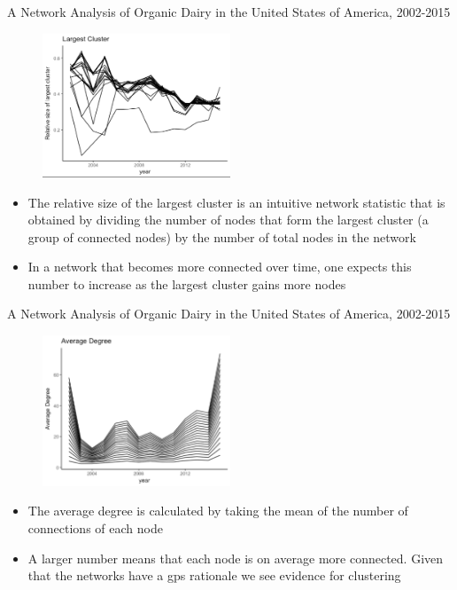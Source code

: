 \documentclass[20]{beamer}
\begin{document}
\begin{frame}{A Network Analysis of Organic Dairy in the United States of America, 2002-2015}
\begin{figure}
   \vspace{-1mm}
   \includegraphics[width=0.5\textwidth]{largest_cluster.png}
\end{figure}
\vspace{-5mm}
\begin{itemize}
\item The relative size of the largest cluster is an intuitive network statistic that is obtained by dividing the number of nodes that form the largest cluster (a group of connected nodes) by the number of total nodes in the network
\item In a network that becomes more connected over time, one expects this number to increase as the largest cluster gains more nodes 
\end{itemize}
\end{frame}


\begin{frame}{A Network Analysis of Organic Dairy in the United States of America, 2002-2015}
\begin{figure}
   \vspace{-1mm}
   \includegraphics[width=0.5\textwidth]{av_degree.png}
\end{figure}
\vspace{-5mm}
\begin{itemize}
\item The average degree is calculated by taking the mean of the number of connections of each node
\item A larger number means that each node is on average more connected. Given that the networks have a gps rationale we see evidence for clustering
\end{itemize}
\end{frame}
\end{document}
